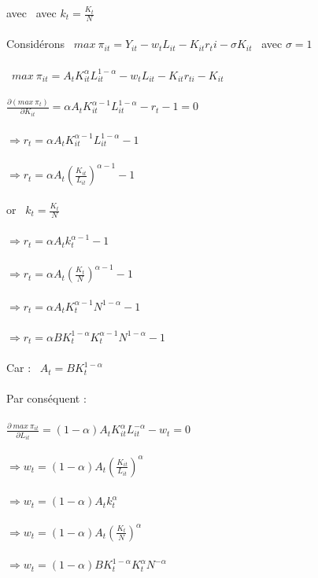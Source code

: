 \documentclass[11pt,twoside,a4paper]{article}
\begin{document}
avec \ avec $k_t=\frac{K_t}{N}$\\ \\
Considérons  \ $ max\ \pi_{it}= Y_{it} -w_tL_{it}-K_{it} r_ti-\sigma K_{it} $ \ avec $\sigma=1$\\ \\
\ $ max\ \pi_{it}= A_tK^{\alpha}_{it}L^{1-\alpha}_{it} -w_tL_{it}-K_{it} r_{ti} -K_{it} $ \\ \\
 $ \frac{\partial (max\ \pi_t)}{\partial K_{it}}=\alpha A_tK^{\alpha-1}_{it}L^{1-\alpha}_{it}-r_t-1 = 0 $\\ \\
 $ \Rightarrow r_t=\alpha A_tK^{\alpha-1}_{it}L^{1-\alpha}_{it} -1$\\ \\
 $ \Rightarrow r_t=\alpha A_t \left(\frac{K_{it}}{L_{it}}\right)^{\alpha-1} -1$\\ \\ or \ $k_t=\frac{K_t}{N}$\\ \\
 $ \Rightarrow r_t=\alpha A_t k_t^{\alpha-1} -1$\\ \\ 
 $ \Rightarrow r_t=\alpha A_t \left(\frac{K_t}{N}\right)^{\alpha-1} -1$\\ \\ 
 $ \Rightarrow r_t=\alpha A_t K_t^{\alpha-1}N^{1-\alpha} -1$\\ \\ 
$ \Rightarrow r_t=\alpha BK^{1-\alpha}_t K_t^{\alpha-1}N^{1-\alpha} -1$\\ \\ 
Car : \ $A_t=BK^{1-\alpha}_t$\\ \\
 Par conséquent : \ \\ \\ 
$\frac{\partial\ max\ \pi_{it} }{\partial L_{it}}=(1-\alpha)A_tK_{it}^{\alpha}L_{it}^{-\alpha}-w_t=0$\\ \\
$ \Rightarrow w_t=(1-\alpha)A_t\left(\frac{K_{it}}{L_{it}}\right)^{\alpha}$\\ \\
$ \Rightarrow w_t=(1-\alpha)A_tk_t^{\alpha}$\\ \\
$ \Rightarrow w_t=(1-\alpha)A_t\left(\frac{K_t}{N}\right)^{\alpha}$\\ \\
$ \Rightarrow w_t=(1-\alpha)BK^{1-\alpha}_t K_t^{\alpha}N^{-\alpha}$\\ \\
\end{document}
